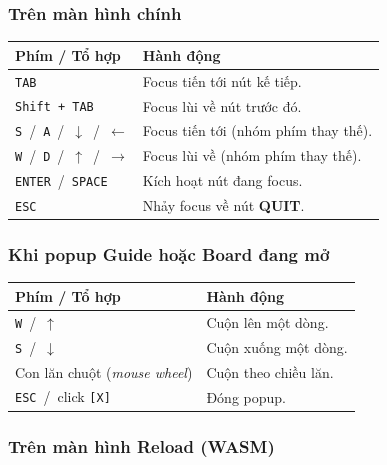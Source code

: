 \documentclass[12pt,a4paper]{article}
\begin{document}
\subsubsection{Trên màn hình chính}

\begin{tabularx}{\linewidth}{|l|X|}
    \hline
    \textbf{Phím / Tổ hợp} & \textbf{Hành động} \\
    \hline
    \texttt{TAB}                                  & Focus tiến tới nút kế tiếp. \\
    \hline
    \texttt{Shift + TAB}                          & Focus lùi về nút trước đó. \\
    \hline
    \texttt{S} \,/\, \texttt{A} \,/\, \texttt{$\downarrow$} \,/\, \texttt{$\leftarrow$} & Focus tiến tới (nhóm phím thay thế). \\
    \hline
    \texttt{W} \,/\, \texttt{D} \,/\, \texttt{$\uparrow$} \,/\, \texttt{$\rightarrow$}  & Focus lùi về (nhóm phím thay thế). \\
    \hline
    \texttt{ENTER} \,/\, \texttt{SPACE}           & Kích hoạt nút đang focus. \\
    \hline
    \texttt{ESC}                                  & Nhảy focus về nút \textbf{QUIT}. \\
    \hline
\end{tabularx}

\subsubsection{Khi popup Guide hoặc Board đang mở}

\begin{tabularx}{\linewidth}{|l|X|}
    \hline
    \textbf{Phím / Tổ hợp} & \textbf{Hành động} \\
    \hline
    \texttt{W} \,/\, \texttt{$\uparrow$}                  & Cuộn lên một dòng. \\
    \hline
    \texttt{S} \,/\, \texttt{$\downarrow$}                & Cuộn xuống một dòng. \\
    \hline
    Con lăn chuột (\textit{mouse wheel})                  & Cuộn theo chiều lăn. \\
    \hline
    \texttt{ESC} \,/\, click \texttt{[X]}                  & Đóng popup. \\
    \hline
\end{tabularx}

\subsubsection{Trên màn hình Reload (WASM)}
\end{document}
